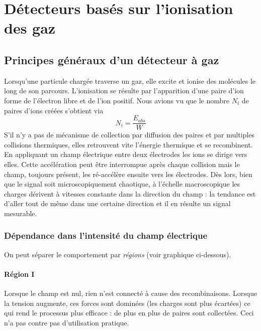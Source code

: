 \chapter{Détecteurs basés sur l'ionisation des gaz}
\section{Principes généraux d'un détecteur à gaz}
Lorsqu'une particule chargée traverse un gaz, elle excite et ionise des molécules le long de son
parcours. L'ionisation se résulte par l'apparition d'une paire d'ion forme de l'électron libre et
de l'ion positif. Nous avions vu que le nombre $N_i$ de paires d'ions créées s'obtient via
\begin{equation}
N_i=\frac{E_{abs}}{W}
\end{equation}
S'il n'y a pas de mécanisme de collection par diffusion des paires et par multiples collisions 
thermiques, elles retrouvent vite l'énergie thermique et se recombinent. En appliquant un champ 
électrique entre deux électrodes les ions se dirige vers elles. Cette accélération peut être
interrompue après chaque collision mais le champ, toujours présent, les ré-accélère ensuite vers
les électrodes. Dès lors, bien que le signal soit microscopiquement chaotique, à l'échelle 
macroscopique les charges dérivent à vitesses constante dans la direction du champ : la tendance
est d'aller tout de même dans une certaine direction et il en résulte un signal mesurable.\ \\


\subsection{Dépendance dans l'intensité du champ électrique}
On peut séparer le comportement par \textit{régions} (voir graphique ci-dessous).





	\subsubsection{Région I}
	Lorsque le champ est nul, rien n'est connecté à cause des recombinaisons. Lorsque la tension
	augmente, ces forces sont dominées (les charges sont plus écartées) ce qui rend le processus
	plus efficace : de plus en plus de paires sont collectées. Ceci n'a pas contre pas d'utilisation
	pratique.
	
